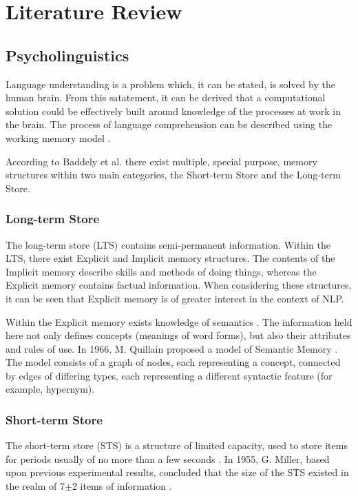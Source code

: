 \documentclass[]{article}
\begin{document}
\section{Literature Review}
\label{sec:LitReview}

\subsection{Psycholinguistics}
\label{sec:Psycholinguistics}
Language understanding is a problem which, it can be stated, is solved by the human brain. From this satatement, it can be derived that a computational solution could be effectively built around knowledge of the processes at work in the brain. The process of language comprehension can be described using the working memory model \cite{MemoryBaddeleyEysenkAnderson}.

According to Baddely et al. \cite{MemoryBaddeleyEysenkAnderson} there exist multiple, special purpose, memory structures within two main categories, the Short-term Store and the Long-term Store.  

\subsubsection{Long-term Store}
\label{LongTerm}
The long-term store (LTS) contains semi-permanent information. Within the LTS, there exist Explicit and Implicit memory structures. The contents of the Implicit memory describe skills and methods of doing things, whereas the Explicit memory contains factual information\cite{MemoryBaddeleyEysenkAnderson}. When considering these structures, it can be seen that Explicit memory is of greater interest in the context of NLP.

Within the Explicit memory exists knowledge of semantics \cite{MemoryBaddeleyEysenkAnderson}. The information held here not only defines concepts (meanings of word forms), but also their attributes and rules of use. In 1966, M. Quillain proposed a model of Semantic Memory \cite{SemanticMemoryQuillain}. The model consists of a graph of nodes, each representing a concept, connected by edges of differing types, each representing a different syntactic feature (for example, hypernym). 


\subsubsection{Short-term Store}
\label{ShortTerm}
The short-term store (STS) is a structure of limited capacity, used to store items for periods usually of no more than a few seconds \cite{MemoryBaddeleyEysenkAnderson}. In 1955, G. Miller, based upon previous experimental results, concluded that the size of the STS existed in the realm of 7$\pm$2 items of information \cite{SevenPlusMinusTwo}. 
\end{document}
